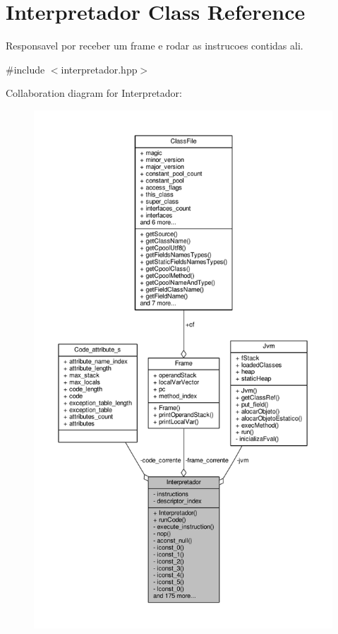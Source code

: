\hypertarget{classInterpretador}{\section{Interpretador Class Reference}
\label{classInterpretador}
}


Responsavel por receber um frame e rodar as instrucoes contidas ali.  




{\ttfamily \#include $<$interpretador.\+hpp$>$}



Collaboration diagram for Interpretador\+:\nopagebreak
\begin{figure}[H]
\begin{center}
\leavevmode
\includegraphics[height=550pt]{classInterpretador__coll__graph}
\end{center}
\end{figure}
